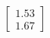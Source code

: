 \documentclass[preview]{standalone}
\begin{document}
\begin{align*}
\begin{bmatrix} 1.53 \\ 1.67 \end{bmatrix}
\end{align*}
\end{document}
